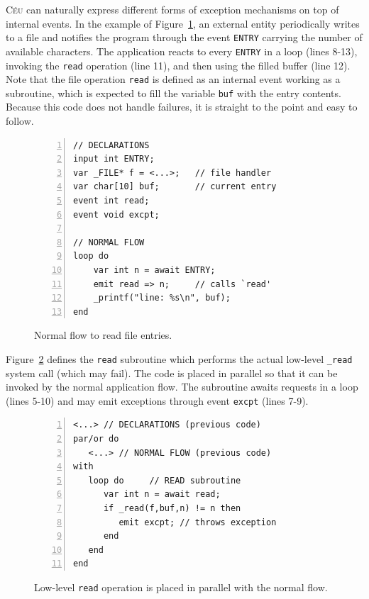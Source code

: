 \documentclass{acm_proc_article-sp}
\newcommand{\CEU}{\textsc{C\'{e}u}\xspace}
\newcommand{\code}[1] {{\small{\texttt{#1}}}}
\newcommand{\1}{\;}
\newcommand{\2}{\;\;}
\newcommand{\3}{\;\;\;}
\newcommand{\5}{\;\;\;\;\;}
\begin{document}
\CEU can naturally express different forms of exception mechanisms on top of 
internal events.
%
In the example of Figure~\ref{lst.excpt1}, an external entity periodically 
writes to a file and notifies the program through the event \code{ENTRY} 
carrying the number of available characters.
The application reacts to every \code{ENTRY} in a loop (lines 8-13), invoking 
the \code{read} operation (line 11), and then using the filled buffer (line 
12).
Note that the file operation \code{read} is defined as an internal event 
working as a subroutine, which is expected to fill the variable \code{buf} with 
the entry contents.
Because this code does not handle failures, it is straight to the point and 
easy to follow.

\begin{figure}[t]
\begin{lstlisting}[numbers=left,xleftmargin=2em]
// DECLARATIONS
input int ENTRY;
var _FILE* f = <...>;   // file handler
var char[10] buf;       // current entry
event int read;
event void excpt;

// NORMAL FLOW
loop do
    var int n = await ENTRY;
    emit read => n;     // calls `read'
    _printf("line: %s\n", buf);
end
\end{lstlisting}
\caption{ Normal flow to read file entries.
\label{lst.excpt1}
}
\end{figure}

Figure~\ref{lst.excpt2} defines the \code{read} subroutine which performs the 
actual low-level \code{\_read} system call (which may fail).
The code is placed in parallel so that it can be invoked by the normal 
application flow.
The subroutine awaits requests in a loop (lines 5-10) and may emit
exceptions through event \code{excpt} (lines 7-9).

\begin{figure}[t]
\begin{lstlisting}[numbers=left,xleftmargin=2em]
<...> // DECLARATIONS (previous code)
par/or do
   <...> // NORMAL FLOW (previous code)
with
   loop do     // READ subroutine
      var int n = await read;
      if _read(f,buf,n) != n then
         emit excpt; // throws exception
      end
   end
end
\end{lstlisting}
\caption{ Low-level \code{read} operation is placed in parallel with the normal 
flow.
\label{lst.excpt2}
}
\end{figure}
\end{document}
